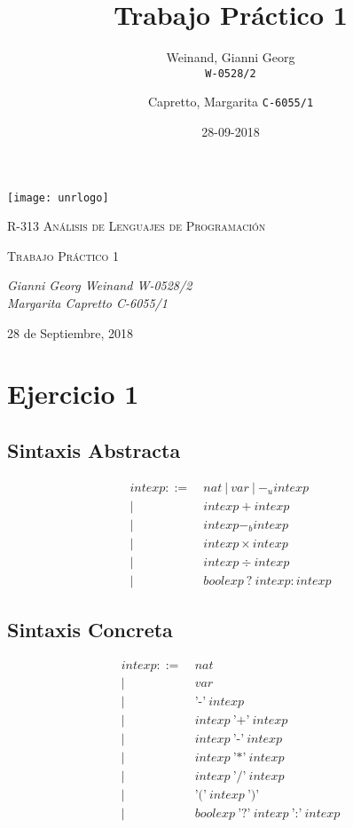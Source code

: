 \documentclass{article}
\title{Trabajo Pr\'actico 1}
\date{28-09-2018}
\author{
	Weinand, Gianni Georg\\
	\texttt{W-0528/2}
	\and
	Capretto, Margarita
	\texttt{C-6055/1}
}
\begin{document}
\begin{titlepage}
	\centering
	\texttt{[image: unrlogo]}\par\vspace{1cm}
	{\scshape\LARGE R-313 An\'alisis de Lenguajes de Programaci\'on \par}
	\vspace{1cm}
	{\scshape\Large Trabajo Pr\'actico 1\par}
	\vspace{1.5cm}
	\vspace{2cm}
	{\Large\itshape Gianni Georg Weinand W-0528/2 \\ Margarita Capretto C-6055/1\par}

	\vfill

	{\large 28 de Septiembre, 2018 \par}
\end{titlepage}


\newpage

\section{Ejercicio 1}

\subsection{Sintaxis Abstracta}
\begin{align*}
intexp ::=\ &nat\ |\ var\ |\ -_{u} intexp\\
|\ &intexp + intexp\\
|\ &intexp -_{b} intexp\\
|\ &intexp \times intexp\\
|\ &intexp \div intexp\\
|\ &boolexp\ ?\ intexp : intexp
\end{align*}

\subsection{Sintaxis Concreta}

\begin{align*}
	intexp ::=\ &nat\\
	|\ &var\\
	|\ &\text{'-'}\ intexp\\
	|\ &intexp\ \text{'+'}\ intexp\\
	|\ &intexp\ \text{'-'}\ intexp\\
	|\ &intexp\ \text{'*'}\ intexp\\
	|\ &intexp\ \text{'/'}\  intexp\\
	|\ &\text{'('}\ intexp\ \text{')'}\\
	|\ &boolexp\ \text{'?'}\ intexp\ \text{':'}\ intexp
\end{align*}
\end{document}
